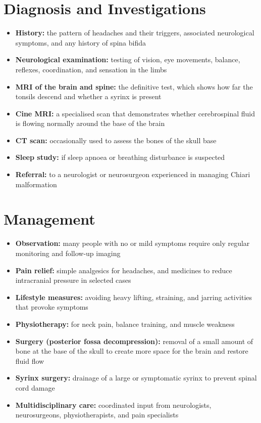 \section*{Diagnosis and Investigations}
\begin{itemize}
    \item \textbf{History:} the pattern of headaches and their triggers, associated neurological symptoms, and any history of spina bifida
    \item \textbf{Neurological examination:} testing of vision, eye movements, balance, reflexes, coordination, and sensation in the limbs
    \item \textbf{MRI of the brain and spine:} the definitive test, which shows how far the tonsils descend and whether a syrinx is present
    \item \textbf{Cine MRI:} a specialised scan that demonstrates whether cerebrospinal fluid is flowing normally around the base of the brain
    \item \textbf{CT scan:} occasionally used to assess the bones of the skull base
    \item \textbf{Sleep study:} if sleep apnoea or breathing disturbance is suspected
    \item \textbf{Referral:} to a neurologist or neurosurgeon experienced in managing Chiari malformation
\end{itemize}

\section*{Management}
\begin{itemize}
    \item \textbf{Observation:} many people with no or mild symptoms require only regular monitoring and follow-up imaging
    \item \textbf{Pain relief:} simple analgesics for headaches, and medicines to reduce intracranial pressure in selected cases
    \item \textbf{Lifestyle measures:} avoiding heavy lifting, straining, and jarring activities that provoke symptoms
    \item \textbf{Physiotherapy:} for neck pain, balance training, and muscle weakness
    \item \textbf{Surgery (posterior fossa decompression):} removal of a small amount of bone at the base of the skull to create more space for the brain and restore fluid flow
    \item \textbf{Syrinx surgery:} drainage of a large or symptomatic syrinx to prevent spinal cord damage
    \item \textbf{Multidisciplinary care:} coordinated input from neurologists, neurosurgeons, physiotherapists, and pain specialists
\end{itemize}

